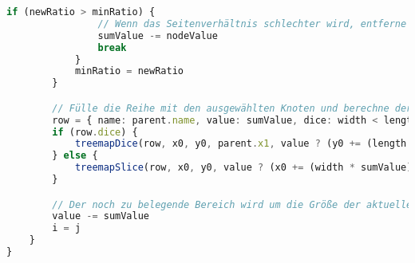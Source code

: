 \begin{lstlisting}[language=typescript, caption={Vereinfachte und kommentierte Grundlage für den Algorithmus der in dieser Arbeit hauptsächlich verwendet wird}, label={lst:squarify_code}]
            if (newRatio > minRatio) {
                // Wenn das Seitenverhältnis schlechter wird, entferne den letzten Knoten und beende die Schleife
                sumValue -= nodeValue
                break
            }
            minRatio = newRatio
        }

        // Fülle die Reihe mit den ausgewählten Knoten und berechne deren Position und Größe
        row = { name: parent.name, value: sumValue, dice: width < length, children: nodes.slice(i, j) }
        if (row.dice) {
            treemapDice(row, x0, y0, parent.x1, value ? (y0 += (length * sumValue) / value) : y0)
        } else {
            treemapSlice(row, x0, y0, value ? (x0 += (width * sumValue) / value) : x0, parent.y1)
        }

        // Der noch zu belegende Bereich wird um die Größe der aktuellen Reihe verkleinert
        value -= sumValue
        i = j
    }
}
\end{lstlisting}